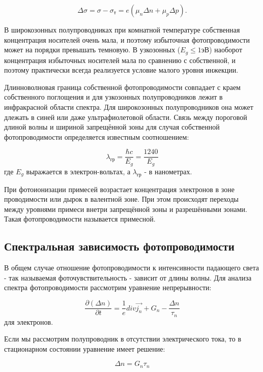 \begin{equation}
\Delta \sigma = \sigma - \sigma_{\text{т}} = e (\mu_{n} \Delta n + \mu_{p} \Delta p).
\end{equation}

В широкозонных полупроводниках при комнатной температуре собственная концентрация носителей очень мала, и поэтому избыточная фотопроводимости может на порядки превышать темновую. В узкозонных ($E_{g} \le 1 \text{эВ}$) наоборот концентрация избыточных носителей мала по сравнению с собственной, и поэтому практически всегда реализуется условие малого уровня инжекции.

Длинноволновая граница собственной фотопроводимости совпадает с краем собственного поглощения и для узкозонных полупроводников лежит в инфракрасной области спектра. Для широкозонных полупроводников она может длежать в синей или даже ультрафиолетовой области. Связь между пороговой длиной волны и шириной запрещённой зоны для случая собственной фотопроводимости определяется известным соотношением:

\begin{equation}
\lambda_{\text{гр}} = \frac{\hbar c}{E_{g}} = \frac{1240}{E_{g}}
\end{equation}
где $E_{g}$ выражается в электрон-вольтах, а $\lambda_{\text{гр}}$ - в нанометрах.

При фотоионизации примесей возрастает концентрация электронов в зоне проводимости или дырок в валентной зоне. При этом происходят переходы между уровнями примеси внетри запрещённой зоны и разрешёнными зонами. Такая фотопроводимости называется примесной.

\subsection{Спектральная зависимость фотопроводимости}
В общем случае отношение фотопроводимости к интенсивности падающего света - так называемая фоточувствительность - зависит от длины волны. Для анализа спектра фотопроводимости рассмотрим уравнение непрерывности:

\begin{equation}
\frac{\partial (\Delta n)}{\partial t} = \frac{1}{e} div \overrightarrow{j_{n}} + G_{n} - \frac{\Delta n}{\tau_{n}}
\end{equation}
для электронов.

Если мы рассмотрим полупроводник в отсутствии электрического тока, то в стационарном состоянии уравнение имеет решение:

\begin{equation}
\Delta n = G_{n} \tau_{n}
\end{equation}

